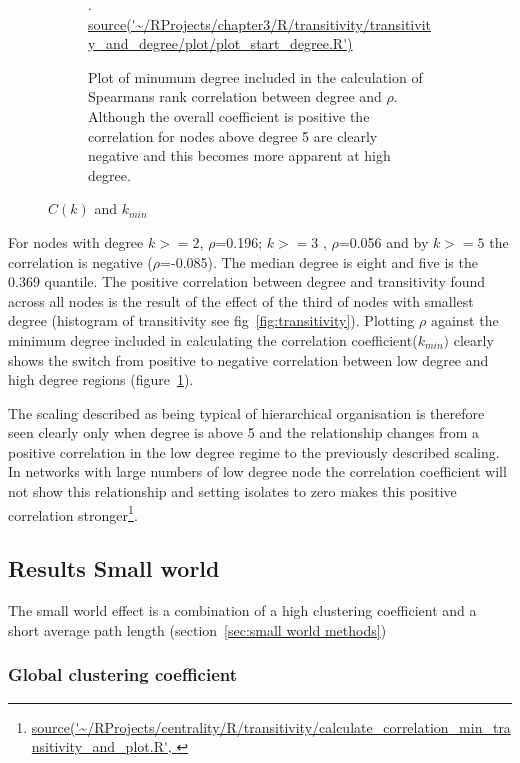 \begin{figure}
\begin{subfigure}[t]{0.45\textwidth}
        \caption{Plot of minumum degree included in the calculation of Spearmans rank correlation between degree and $\rho$. Although the overall coefficient is positive the correlation for nodes above degree 5 are clearly negative and this becomes more apparent at high degree.}.
    \tiny\url{source('~/RProjects/chapter3/R/transitivity/transitivity_and_degree/plot/plot_start_degree.R')}
    \label{fig:Plot of minumum degree included in the calculation of Spearmans rank correlation between degree and rho}
    \end{subfigure}
    \caption{$C(k)$ and $k_{min}$}
    \label{fig:Plots of degree distribution}
\end{figure}


For nodes with degree $k>=2$, $\rho$=0.196; $k>=3$ , $\rho$=0.056 and by $k>=5$ the correlation is negative ($\rho$=-0.085). The median degree is eight and five is the 0.369 quantile. The positive correlation between degree and transitivity found across all nodes is the result of the effect of the third of nodes with smallest degree (histogram of transitivity  see fig~\ref{fig:transitivity}). Plotting $\rho$ against the minimum degree included in calculating the correlation coefficient($k_{min})$ clearly shows the switch from positive to negative correlation between low degree and high degree regions (figure~\ref{fig:Plot of minumum degree included in the calculation of Spearmans rank correlation between degree and rho}).

The scaling described as being typical of hierarchical organisation is therefore seen clearly only when degree is above 5 and the relationship changes from a positive correlation in the low degree regime to the previously described scaling. In networks with large numbers of low degree node the correlation coefficient will not show this relationship and setting isolates to zero makes this positive correlation stronger\footnote{ \url{source('~/RProjects/centrality/R/transitivity/calculate_correlation_min_transitivity_and_plot.R', }}.



\subsection{Results Small world}

The small world effect is a combination of a high clustering coefficient and a short average path length (section~\ref{sec:small world methods})
\subsubsection{Global clustering coefficient}
\label{sec:results_global_clustering_coefficient}

